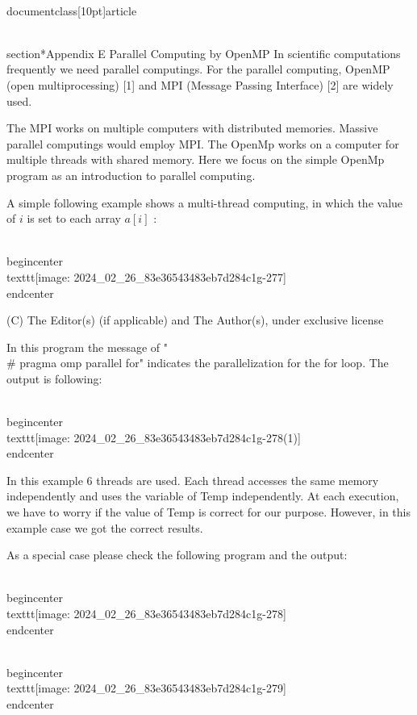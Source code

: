 \\documentclass[10pt]{article}
\begin{document}
{{{{{{\\section*{Appendix E 
 Parallel Computing by OpenMP}
In scientific computations frequently we need parallel computings. For the parallel computing, OpenMP (open multiprocessing) [1] and MPI (Message Passing Interface) [2] are widely used.

The MPI works on multiple computers with distributed memories. Massive parallel computings would employ MPI. The OpenMp works on a computer for multiple threads with shared memory. Here we focus on the simple OpenMp program as an introduction to parallel computing.

A simple following example shows a multi-thread computing, in which the value of $i$ is set to each array $a[i]$ :

\\begin{center}
\\texttt{[image: 2024\_02\_26\_83e36543483eb7d284c1g-277]}
\\end{center}

(C) The Editor(s) (if applicable) and The Author(s), under exclusive license

In this program the message of "\\# pragma omp parallel for" indicates the parallelization for the for loop. The output is following:

\\begin{center}
\\texttt{[image: 2024\_02\_26\_83e36543483eb7d284c1g-278(1)]}
\\end{center}

In this example 6 threads are used. Each thread accesses the same memory independently and uses the variable of Temp independently. At each execution, we have to worry if the value of Temp is correct for our purpose. However, in this example case we got the correct results.

As a special case please check the following program and the output:

\\begin{center}
\\texttt{[image: 2024\_02\_26\_83e36543483eb7d284c1g-278]}
\\end{center}

\\begin{center}
\\texttt{[image: 2024\_02\_26\_83e36543483eb7d284c1g-279]}
\\end{center}

}}}}}}
\end{document}
